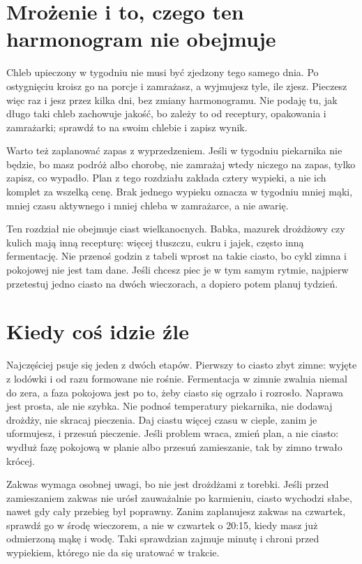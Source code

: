 \section{Mrożenie i to, czego ten harmonogram nie obejmuje}

Chleb upieczony w tygodniu nie musi być zjedzony tego samego dnia. Po ostygnięciu kroisz go na porcje i zamrażasz, a wyjmujesz tyle, ile zjesz. Pieczesz więc raz i jesz przez kilka dni, bez zmiany harmonogramu. Nie podaję tu, jak długo taki chleb zachowuje jakość, bo zależy to od receptury, opakowania i zamrażarki; sprawdź to na swoim chlebie i zapisz wynik.

Warto też zaplanować zapas z wyprzedzeniem. Jeśli w tygodniu piekarnika nie będzie, bo masz podróż albo chorobę, nie zamrażaj wtedy niczego na zapas, tylko zapisz, co wypadło. Plan z tego rozdziału zakłada cztery wypieki, a nie ich komplet za wszelką cenę. Brak jednego wypieku oznacza w tygodniu mniej mąki, mniej czasu aktywnego i mniej chleba w zamrażarce, a nie awarię.

Ten rozdział nie obejmuje ciast wielkanocnych. Babka, mazurek drożdżowy czy kulich mają inną recepturę: więcej tłuszczu, cukru i jajek, często inną fermentację. Nie przenoś godzin z tabeli wprost na takie ciasto, bo cykl zimna i pokojowej nie jest tam dane. Jeśli chcesz piec je w tym samym rytmie, najpierw przetestuj jedno ciasto na dwóch wieczorach, a dopiero potem planuj tydzień.

\section{Kiedy coś idzie źle}

Najczęściej psuje się jeden z dwóch etapów. Pierwszy to ciasto zbyt zimne: wyjęte z lodówki i od razu formowane nie rośnie. Fermentacja w zimnie zwalnia niemal do zera, a faza pokojowa jest po to, żeby ciasto się ogrzało i rozrosło. Naprawa jest prosta, ale nie szybka. Nie podnoś temperatury piekarnika, nie dodawaj drożdży, nie skracaj pieczenia. Daj ciastu więcej czasu w cieple, zanim je uformujesz, i przesuń pieczenie. Jeśli problem wraca, zmień plan, a nie ciasto: wydłuż fazę pokojową w planie albo przesuń zamieszanie, tak by zimno trwało krócej.

Zakwas wymaga osobnej uwagi, bo nie jest drożdżami z torebki. Jeśli przed zamieszaniem zakwas nie urósł zauważalnie po karmieniu, ciasto wychodzi słabe, nawet gdy cały przebieg był poprawny. Zanim zaplanujesz zakwas na czwartek, sprawdź go w środę wieczorem, a nie w czwartek o 20:15, kiedy masz już odmierzoną mąkę i wodę. Taki sprawdzian zajmuje minutę i chroni przed wypiekiem, którego nie da się uratować w trakcie.

